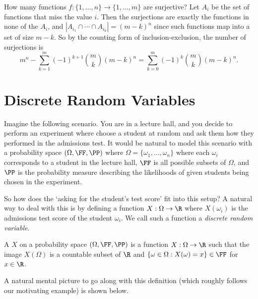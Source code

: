 \begin{example}
	How many functions $f : \{1, \dots, n\} \rightarrow \{1, \dots, m\}$ are surjective? Let $A_i$ be the set of functions that miss the value $i$. Then the surjections are exactly the functions in none of the $A_i$, and $|A_{i_1} \cap \cdots \cap A_{i_k}| = (m - k)^n$ since such functions map into a set of size $m - k$. So by the counting form of inclusion-exclusion, the number of surjections is
	$$
	m^n - \sum_{k = 1}^{m} (-1)^{k + 1} \binom{m}{k}(m - k)^n = \sum_{k = 0}^{m} (-1)^k \binom{m}{k} (m - k)^n.
	$$
\end{example}


\section{Discrete Random Variables}

Imagine the following scenario. You are in a lecture hall, and you decide to perform an experiment where choose a student at random and ask them how they performed in the admissions test. It would be natural to model this scenario with a probability space $(\Omega, \FF, \PP)$ where $\Omega = \{\omega_1, \dots, \omega_n\}$ where each $\omega_i$ corresponds to a student in the lecture hall, $\FF$ is all possible subsets of $\Omega$, and $\PP$ is the probability measure describing the likelihoods of given students being chosen in the experiment.

So how does the `asking for the student's test score' fit into this setup? A natural way to deal with this is by defining a function $X : \Omega \rightarrow \R$ where $X(\omega_i)$ is the admissions test score of the student $\omega_i$. We call such a function a \emph{discrete random variable}. 

\begin{definition}
	A  $X$ on a probability space $(\Omega, \FF, \PP)$ is a function $X : \Omega \rightarrow \R$ such that the image $X(\Omega)$ is a countable subset of $\R$ and $\{ \omega \in \Omega : X(\omega) = x \} \in \FF$ for $x \in \R$.
\end{definition}

A natural mental picture to go along with this definition (which roughly follows our motivating example) is shown below.

